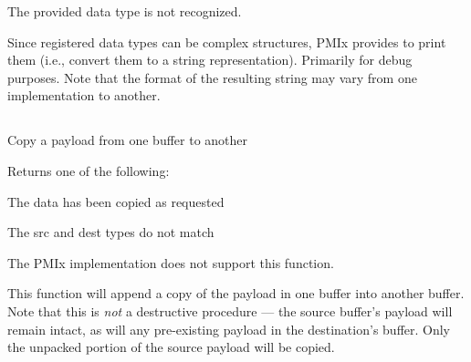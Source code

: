 \returnstart
\begin{constantdesc}
\item {} The provided data type is not recognized.
\end{constantdesc}
\returnend

\descr

Since registered data types can be complex structures, \ac{PMIx} provides  to print them (i.e., convert them to a string representation). Primarily for debug purposes.  Note that the format of the resulting string may vary from one implementation to another.


\subsection{}

\summary

Copy a payload from one buffer to another

\format


\begin{arglist}
\end{arglist}

Returns one of the following:
\begin{constantdesc}
\item {} The data has been copied as requested
\item {} The src and dest  types do not match
\item {} The \ac{PMIx} implementation does not support this function.
\end{constantdesc}

\descr

This function will append a copy of the payload in one buffer into another buffer. Note that this is \textit{not} a destructive procedure --- the source buffer's payload will remain intact, as will any pre-existing payload in the destination's buffer. Only the unpacked portion of the source payload will be copied.

